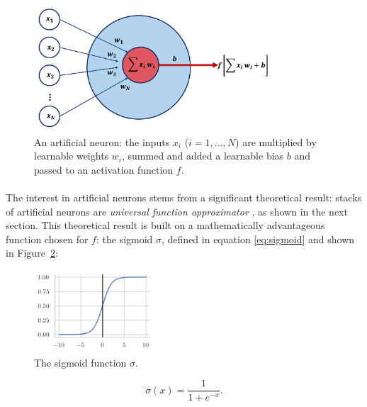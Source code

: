 \begin{figure}[h!]
    \center
    \includegraphics[width=0.8\textwidth]{Images/ML/ann.png}
    \caption{An artificial neuron: the inputs $x_i$ ($i= 1, ..., N$) are multiplied by learnable weights $w_i$, summed and added a learnable bias $b$ and passed to an activation function $f$.} 
    \label{fig:annModel}
\end{figure}

\paragraph{} The interest in artificial neurons stems from a significant theoretical result: stacks of artificial neurons are \textit{universal function approximator} \cite{universalFuncApproxNN,HORNIK1989359}, as shown in the next section. This theoretical result is built on a mathematically advantageous function chosen for $f$: the sigmoid $\sigma$, defined in equation \ref{eq:sigmoid} and shown in Figure~\ref{fig:sigmoid}:
\begin{figure}
    \begin{center}
        \includegraphics[width=0.4\textwidth]{Images/ML/sigmoid.png}
        \caption{The sigmoid function $\sigma$.} 
        \label{fig:sigmoid}
    \end{center}
\end{figure}

\begin{equation}\label{eq:sigmoid}
    \sigma(x) = \frac{1}{1 + e^{-x}}.
\end{equation}

